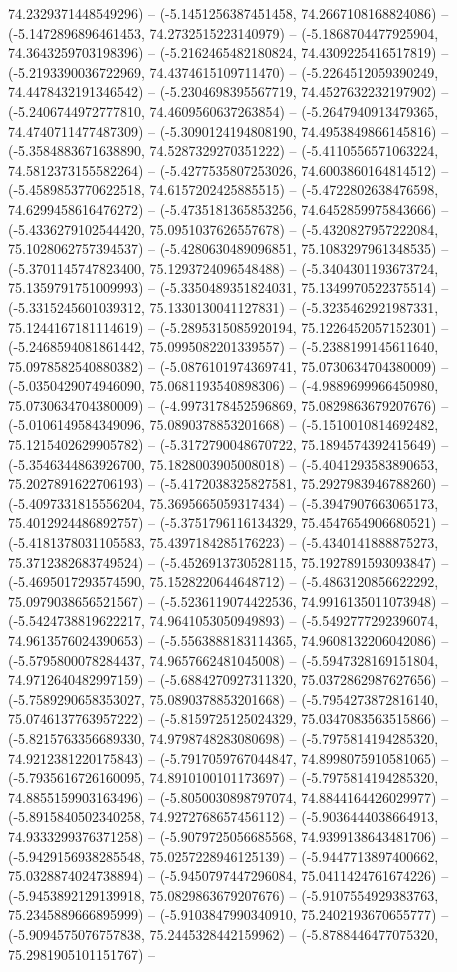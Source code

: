 74.2329371448549296) -- (-5.1451256387451458, 74.2667108168824086) -- (-5.1472896896461453, 74.2732515223140979) -- (-5.1868704477925904, 74.3643259703198396) -- (-5.2162465482180824, 74.4309225416517819) -- (-5.2193390036722969, 74.4374615109711470) -- (-5.2264512059390249, 74.4478432191346542) -- (-5.2304698395567719, 74.4527632232197902) -- (-5.2406744972777810, 74.4609560637263854) -- (-5.2647940913479365, 74.4740711477487309) -- (-5.3090124194808190, 74.4953849866145816) -- (-5.3584883671638890, 74.5287329270351222) -- (-5.4110556571063224, 74.5812373155582264) -- (-5.4277535807253026, 74.6003860164814512) -- (-5.4589853770622518, 74.6157202425885515) -- (-5.4722802638476598, 74.6299458616476272) -- (-5.4735181365853256, 74.6452859975843666) -- (-5.4336279102544420, 75.0951037626557678) -- (-5.4320827957222084, 75.1028062757394537) -- (-5.4280630489096851, 75.1083297961348535) -- (-5.3701145747823400, 75.1293724096548488) -- (-5.3404301193673724, 75.1359791751009993) -- (-5.3350489351824031, 75.1349970522375514) -- (-5.3315245601039312, 75.1330130041127831) -- (-5.3235462921987331, 75.1244167181114619) -- (-5.2895315085920194, 75.1226452057152301) -- (-5.2468594081861442, 75.0995082201339557) -- (-5.2388199145611640, 75.0978582540880382) -- (-5.0876101974369741, 75.0730634704380009) -- (-5.0350429074946090, 75.0681193540898306) -- (-4.9889699966450980, 75.0730634704380009) -- (-4.9973178452596869, 75.0829863679207676) -- (-5.0106149584349096, 75.0890378853201668) -- (-5.1510010814692482, 75.1215402629905782) -- (-5.3172790048670722, 75.1894574392415649) -- (-5.3546344863926700, 75.1828003905008018) -- (-5.4041293583890653, 75.2027891622706193) -- (-5.4172038325827581, 75.2927983946788260) -- (-5.4097331815556204, 75.3695665059317434) -- (-5.3947907663065173, 75.4012924486892757) -- (-5.3751796116134329, 75.4547654906680521) -- (-5.4181378031105583, 75.4397184285176223) -- (-5.4340141888875273, 75.3712382683749524) -- (-5.4526913730528115, 75.1927891593093847) -- (-5.4695017293574590, 75.1528220644648712) -- (-5.4863120856622292, 75.0979038656521567) -- (-5.5236119074422536, 74.9916135011073948) -- (-5.5424738819622217, 74.9641053050949893) -- (-5.5492777292396074, 74.9613576024390653) -- (-5.5563888183114365, 74.9608132206042086) -- (-5.5795800078284437, 74.9657662481045008) -- (-5.5947328169151804, 74.9712640482997159) -- (-5.6884270927311320, 75.0372862987627656) -- (-5.7589290658353027, 75.0890378853201668) -- (-5.7954273872816140, 75.0746137763957222) -- (-5.8159725125024329, 75.0347083563515866) -- (-5.8215763356689330, 74.9798748283080698) -- (-5.7975814194285320, 74.9212381220175843) -- (-5.7917059767044847, 74.8998075910581065) -- (-5.7935616726160095, 74.8910100101173697) -- (-5.7975814194285320, 74.8855159903163496) -- (-5.8050030898797074, 74.8844164426029977) -- (-5.8915840502340258, 74.9272768657456112) -- (-5.9036444038664913, 74.9333299376371258) -- (-5.9079725056685568, 74.9399138643481706) -- (-5.9429156938285548, 75.0257228946125139) -- (-5.9447713897400662, 75.0328874024738894) -- (-5.9450797447296084, 75.0411424761674226) -- (-5.9453892129139918, 75.0829863679207676) -- (-5.9107554929383763, 75.2345889666895999) -- (-5.9103847990340910, 75.2402193670655777) -- (-5.9094575076757838, 75.2445328442159962) -- (-5.8788446477075320, 75.2981905101151767) -- 